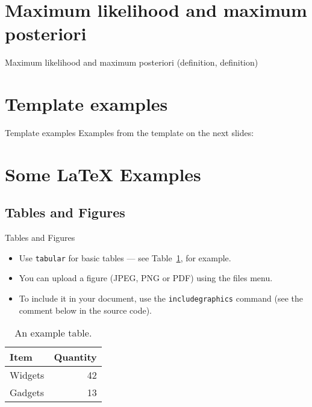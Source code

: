 \documentclass{beamer}
\begin{document}
\section{Maximum likelihood and maximum posteriori}

\begin{frame}{Maximum likelihood and maximum posteriori}
  (definition, definition)
\end{frame}

\section{Template examples}

\begin{frame}{Template examples}
  Examples from the template on the next slides:
\end{frame}

\section{Some \LaTeX{} Examples}

\subsection{Tables and Figures}

\begin{frame}{Tables and Figures}

\begin{itemize}
\item Use \texttt{tabular} for basic tables --- see Table~\ref{tab:widgets}, for example.
\item You can upload a figure (JPEG, PNG or PDF) using the files menu.
\item To include it in your document, use the \texttt{includegraphics} command (see the comment below in the source code).
\end{itemize}


\begin{table}
\centering
\begin{tabular}{l|r}
Item & Quantity \\\hline
Widgets & 42 \\
Gadgets & 13
\end{tabular}
\caption{\label{tab:widgets}An example table.}
\end{table}

\end{frame}
\end{document}
